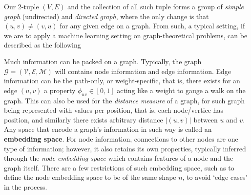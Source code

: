 \documentclass[10pt,oneside,oldfontcommands,dvipsnames,article]{memoir}
\begin{document}
Our 2-tuple $(V,E)$ and the collection of all such tuple forms a group of \textit{simple graph} (undirected) and \textit{directed graph}, where the only change is that $(u,v)\neq (v,u)$ for any given edge on a graph. From such, a typical setting, if we are to apply a machine learning setting on graph-theoretical problems, can be described as the following




Much information can be packed on a graph. Typically, the graph $\mathcal{G}= (\mathcal{V},\mathcal{E},\mathcal{M})$ will contains node information and edge information. Edge information can be the path-only, or weight-specific, that is, there exists for an edge $(u,v)$ a property $\phi_{uv}\in [0,1]$ acting like a weight to gauge a walk on the graph. This can also be used for the \textit{distance measure} of a graph, for such graph being represented with values per position, that is, each node/vertice has position, and similarly there exists arbitrary distance $\lvert (u,v)\rvert$ between $u$ and $v$. Any space that encode a graph's information in such way is called an \textbf{embedding space}. For node information, connections to other nodes are one type of information; however, it also retains its own properties, typically inferred through the \textit{node embedding space} which contains features of a node and the graph itself. There are a few restrictions of such embedding space, such as to define the node embedding space to be of the same shape $n$, to avoid `edge cases' in the process. 
\end{document}

